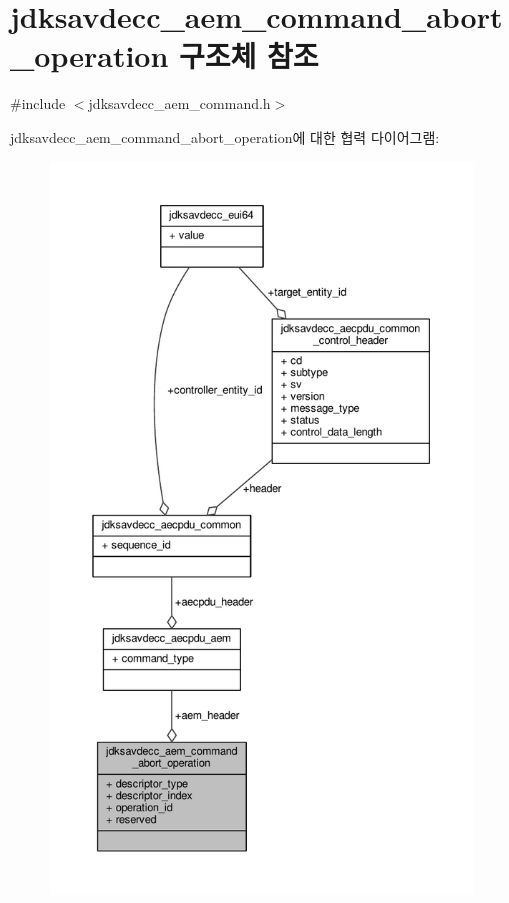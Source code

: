 \hypertarget{structjdksavdecc__aem__command__abort__operation}{}\section{jdksavdecc\+\_\+aem\+\_\+command\+\_\+abort\+\_\+operation 구조체 참조}
\label{structjdksavdecc__aem__command__abort__operation}


{\ttfamily \#include $<$jdksavdecc\+\_\+aem\+\_\+command.\+h$>$}



jdksavdecc\+\_\+aem\+\_\+command\+\_\+abort\+\_\+operation에 대한 협력 다이어그램\+:
\nopagebreak
\begin{figure}[H]
\begin{center}
\leavevmode
\includegraphics[height=550pt]{structjdksavdecc__aem__command__abort__operation__coll__graph}
\end{center}
\end{figure}
